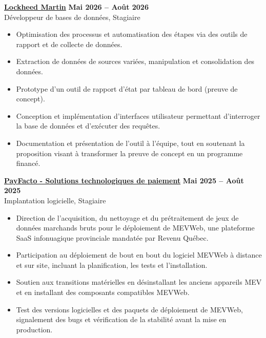 \documentclass[10pt]{article}
\begin{document}
{\href{https://www.lockheedmartin.com}{\textbf{Lockheed Martin}}} \hfill \textbf{ Mai 2026 -- Août 2026} \\
{Développeur de bases de données, Stagiaire}
\vspace{-3mm}
\begin{itemize}[left=0.15in, itemsep=0pt]
    \item Optimisation des processus et automatisation des étapes via des outils de rapport et de collecte de données.
    \item Extraction de données de sources variées, manipulation et consolidation des données.
    \item Prototype d'un outil de rapport d'état par tableau de bord (preuve de concept).
    \item Conception et implémentation d'interfaces utilisateur permettant d'interroger la base de données et d'exécuter des requêtes.
    \item Documentation et présentation de l'outil à l'équipe, tout en soutenant la proposition visant à transformer la preuve de concept en un programme financé.
\end{itemize}

{\href{https://www.payfacto.com}{\textbf{PayFacto - Solutions technologiques de paiement}}} \hfill \textbf{Mai 2025 -- Août 2025} \\
{Implantation logicielle, Stagiaire}
\vspace{-3mm}
\begin{itemize}[left=0.15in, itemsep=0pt]
    \item Direction de l'acquisition, du nettoyage et du prétraitement de jeux de données marchands bruts pour le déploiement de MEVWeb, une plateforme SaaS infonuagique provinciale mandatée par Revenu Québec.
    \item Participation au déploiement de bout en bout du logiciel MEVWeb à distance et sur site, incluant la planification, les tests et l'installation.
    \item Soutien aux transitions matérielles en désinstallant les anciens appareils MEV et en installant des composants compatibles MEVWeb.
    \item Test des versions logicielles et des paquets de déploiement de MEVWeb, signalement des bugs et vérification de la stabilité avant la mise en production.
\end{itemize}
\end{document}
